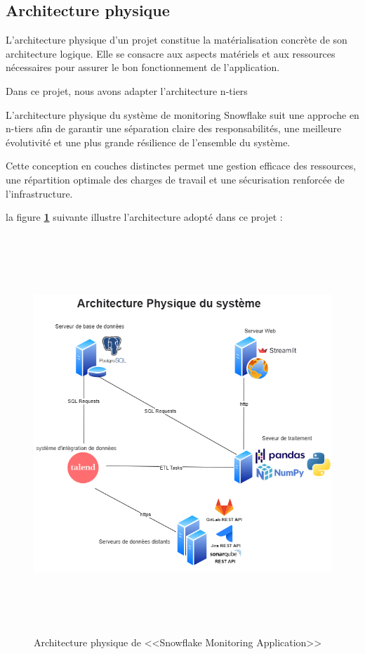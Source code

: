     \subsection{Architecture physique}
    \par L'architecture physique d'un projet constitue la matérialisation concrète de son architecture logique. Elle se consacre aux aspects matériels et aux ressources nécessaires pour assurer le bon fonctionnement de l'application\cite{archi_phy}.
    \par Dans ce projet, nous avons adapter l'architecture n-tiers 
    \par L'architecture physique du système de monitoring Snowflake suit une approche en n-tiers afin de garantir une séparation claire des responsabilités, 
    une meilleure évolutivité et une plus grande résilience de l'ensemble du système.
    \par Cette conception en couches distinctes permet une gestion efficace des ressources, une répartition optimale des charges de travail et une sécurisation renforcée de l'infrastructure. 
\par la figure \textbf{\ref{fig:arch_phy}} suivante illustre l'architecture adopté dans ce projet : 
        \begin{figure}[H]
        \centering
        \includegraphics[width = 17cm , height=15cm]{img/techno/archi_phy.png}
        \caption{Architecture physique de <<Snowflake Monitoring Application>>}
        \label{fig:arch_phy}
        \end{figure}
